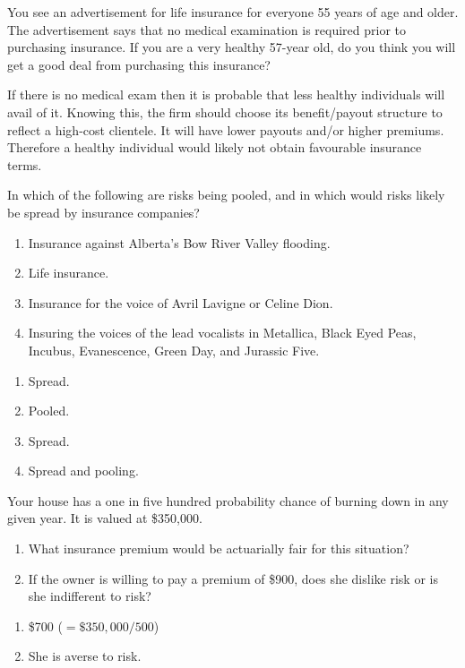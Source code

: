 \begin{enumialphparenastyle}
\begin{econex}\label{ex:ch7ex2}
You see an advertisement for life insurance for everyone 55 years of age and older. The advertisement says that no medical examination is required prior to purchasing insurance. If you are a very healthy 57-year old, do you think you will get a good deal from purchasing this insurance?
\begin{econsolution}
	If there is no medical exam then it is probable that less healthy individuals will avail of it. Knowing this, the firm should choose its benefit/payout structure to reflect a high-cost clientele. It will have lower payouts and/or higher premiums. Therefore a healthy individual would likely not obtain favourable insurance terms.
	
\end{econsolution}
\end{econex}

\begin{econex}\label{ex:ch7ex3}
In which of the following are risks being pooled, and in which would risks likely be spread by insurance companies?
\begin{enumerate}
\item	Insurance against Alberta's Bow River Valley flooding.
\item	Life insurance.
\item	Insurance for the voice of Avril Lavigne or Celine Dion.
\item	Insuring the voices of the lead vocalists in Metallica, Black Eyed Peas, Incubus, Evanescence, Green Day, and Jurassic Five.
\end{enumerate}
\begin{econsolution}
\begin{enumerate}
\item	Spread.
\item	Pooled.
\item	Spread.
\item	Spread and pooling.
\end{enumerate}
\end{econsolution}
\end{econex}

\begin{econex}\label{ex:ch7ex4}
Your house has a one in five hundred probability chance of burning down in any given year. It is valued at \$350,000.
\begin{enumerate}
	\item What insurance premium would be actuarially fair for this situation?
	\item If the owner is willing to pay a premium of \$900, does she dislike risk or is she indifferent to risk?
\end{enumerate}
\begin{econsolution}
\begin{enumerate}
	\item	\$700 ($=\$350,000/500$)
	\item	She is averse to risk.
\end{enumerate}
\end{econsolution}
\end{econex}


\end{enumialphparenastyle}

